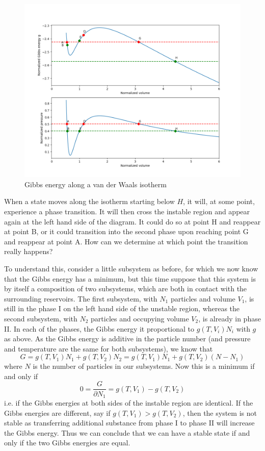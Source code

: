 \documentclass[a4paper, draft]{article}
\theoremstyle{own}
\theoremstyle{remark}
\begin{document}
\begin{figure}[ht]
\centering
\includegraphics[scale=0.5]{VanDerWaalsMaxwell}
\caption{Gibbs energy along a van der Waals isotherm}
\label{fig:VanDerWaalsMaxwell}
\end{figure}

When a state moves along the isotherm starting below $H$, it will, at some point, experience a phase transition. It will then cross the instable region and appear again at the left hand side of the diagram. It could do so at point H and reappear at point 
B, or it could transition into the second phase upon reaching point G and reappear at point A. How can we determine at which point the transition really happens?

To understand this, consider a little subsystem as before, for which we now know that the Gibbs energy has a minimum, but this time suppose that this system is by itself a composition of two subsystems, which are both in contact with the surrounding reservoirs. The first subsystem, with $N_1$ particles and volume $V_1$, is still in the phase I on the left hand side of the unstable region, whereas the second subsystem, with $N_2$ particles and occupying volume $V_2$, is already in phase II. In each of the phases, the Gibbs energy it proportional to $g(T, V_i) N_i$ with $g$ as above. As the Gibbs energy is additive in the particle number (and pressure and temperature are the same for both subsystems), we know that
$$
G = g(T, V_1) N_1 + g(T, V_2) N_2 = g(T, V_1) N_1 + g(T, V_2) (N - N_1)
$$
where $N$ is the number of particles in our subsystems. Now this is a minimum if and only if
$$
0 = \frac{G}{\partial N_1} = g(T, V_1) - g(T, V_2)
$$
i.e. if the Gibbs energies at both sides of the instable region are identical. If the Gibbs energies are different, say if $g(T, V_1) > g(T, V_2)$, then the system is not stable as transferring additional substance from phase I to phase II will increase the Gibbs energy. Thus we can conclude that we can have a stable state if and only if the two Gibbs energies are equal.
\end{document}
